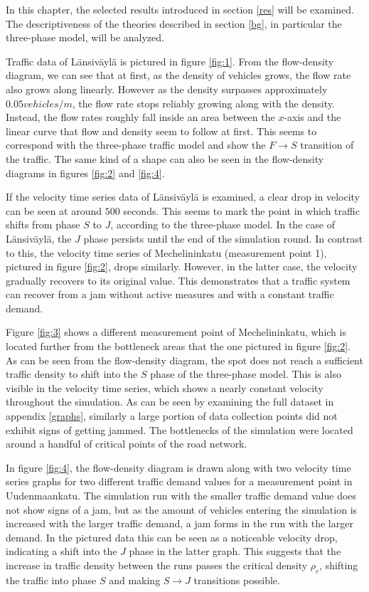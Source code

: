 \documentclass[english, 12pt, a4paper, elec, utf8, pdfa, online]{aaltothesis}
\begin{document}
In this chapter, the selected results introduced in section \ref{res} will be examined. The descriptiveness of the theories described in section \ref{bg}, in particular the three-phase model, will be analyzed.

Traffic data of Länsiväylä is pictured in figure \ref{fig:1}. From the flow-density diagram, we can see that at first, as the density of vehicles grows, the flow rate also grows along linearly. However as the density surpasses approximately $0.05 vehicles/m$, the flow rate stops reliably growing along with the density. Instead, the flow rates roughly fall inside an area between the $x$-axis and the linear curve that flow and density seem to follow at first. This seems to correspond with the three-phase traffic model and show the $F \to S$ transition of the traffic. The same kind of a shape can also be seen in the flow-density diagrams in figures \ref{fig:2} and \ref{fig:4}.

If the velocity time series data of Länsiväylä is examined, a clear drop in velocity can be seen at around $500$ seconds. This seems to mark the point in which traffic shifts from phase $S$ to $J$, according to the three-phase model. In the case of Länsiväylä, the $J$ phase persists until the end of the simulation round. In contrast to this, the velocity time series of Mechelininkatu (measurement point 1), pictured in figure \ref{fig:2}, drops similarly. However, in the latter case, the velocity gradually recovers to its original value. This demonstrates that a traffic system can recover from a jam without active measures and with a constant traffic demand.

Figure \ref{fig:3} shows a different measurement point of Mechelininkatu, which is located further from the bottleneck areas that the one pictured in figure \ref{fig:2}. As can be seen from the flow-density diagram, the spot does not reach a sufficient traffic density to shift into the $S$ phase of the three-phase model. This is also visible in the velocity time series, which shows a nearly constant velocity throughout the simulation. As can be seen by examining the full dataset in appendix \ref{graphs}, similarly a large portion of data collection points did not exhibit signs of getting jammed. The bottlenecks of the simulation were located around a handful of critical points of the road network.

In figure \ref{fig:4}, the flow-density diagram is drawn along with two velocity time series graphs for two different traffic demand values for a measurement point in Uudenmaankatu. The simulation run with the smaller traffic demand value does not show signs of a jam, but as the amount of vehicles entering the simulation is increased with the larger traffic demand, a jam forms in the run with the larger demand. In the pictured data this can be seen as a noticeable velocity drop, indicating a shift into the $J$ phase in the latter graph. This suggests that the increase in traffic density between the runs passes the critical density $\rho_c$, shifting the traffic into phase $S$ and making $S \to J$ transitions possible.
\end{document}
